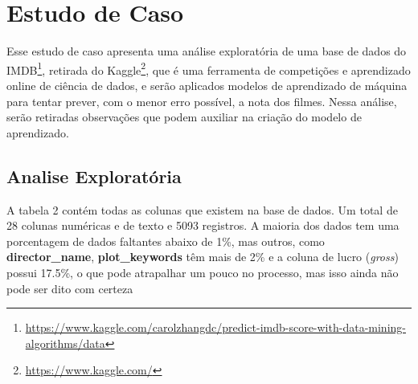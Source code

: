 \section{Estudo de Caso}
Esse estudo de caso apresenta uma análise exploratória de uma base de dados do IMDB\footnote{\url{https://www.kaggle.com/carolzhangdc/predict-imdb-score-with-data-mining-algorithms/data}}, retirada do Kaggle\footnote{\url{https://www.kaggle.com/}}, que é uma ferramenta de competições e aprendizado online de ciência de dados, e serão aplicados modelos de aprendizado de máquina para tentar prever, com o menor erro possível, a nota dos filmes. Nessa análise, serão retiradas observações que podem auxiliar na criação do modelo de aprendizado.
\subsection{Analise Exploratória}
A tabela 2 contém todas as colunas que existem na base de dados. Um total de 28 colunas numéricas e de texto e 5093 registros. A maioria dos dados tem uma porcentagem de dados faltantes abaixo de 1\%, mas outros, como \textbf{director\_name}, \textbf{plot\_keywords} têm mais de 2\% e a coluna de lucro (\textit{gross}) possui 17.5\%, o que pode atrapalhar um pouco no processo, mas isso ainda não pode ser dito com certeza


